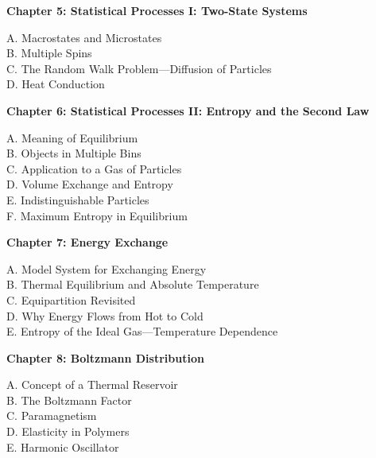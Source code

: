\documentclass[12pt]{article}
\theoremstyle{definition} %
\theoremstyle{plain} %
\begin{document}
\vspace{1em}

\noindent \textbf{Chapter 5: Statistical Processes I: Two-State Systems}

\noindent A. Macrostates and Microstates \\
\noindent B. Multiple Spins \\
\noindent C. The Random Walk Problem---Diffusion of Particles \\
\noindent D. Heat Conduction 

\vspace{1em}

\noindent \textbf{Chapter 6: Statistical Processes II: Entropy and the Second Law}

\noindent A. Meaning of Equilibrium \\
\noindent B. Objects in Multiple Bins \\
\noindent C. Application to a Gas of Particles \\
\noindent D. Volume Exchange and Entropy \\
\noindent E. Indistinguishable Particles \\
\noindent F. Maximum Entropy in Equilibrium 

\vspace{1em}

\noindent \textbf{Chapter 7: Energy Exchange}

\noindent A. Model System for Exchanging Energy \\
\noindent B. Thermal Equilibrium and Absolute Temperature \\
\noindent C. Equipartition Revisited \\
\noindent D. Why Energy Flows from Hot to Cold \\
\noindent E. Entropy of the Ideal Gas---Temperature Dependence 

\vspace{1em}

\noindent \textbf{Chapter 8: Boltzmann Distribution}

\noindent A. Concept of a Thermal Reservoir \\
\noindent B. The Boltzmann Factor \\
\noindent C. Paramagnetism \\
\noindent D. Elasticity in Polymers \\
\noindent E. Harmonic Oscillator 
\end{document}
